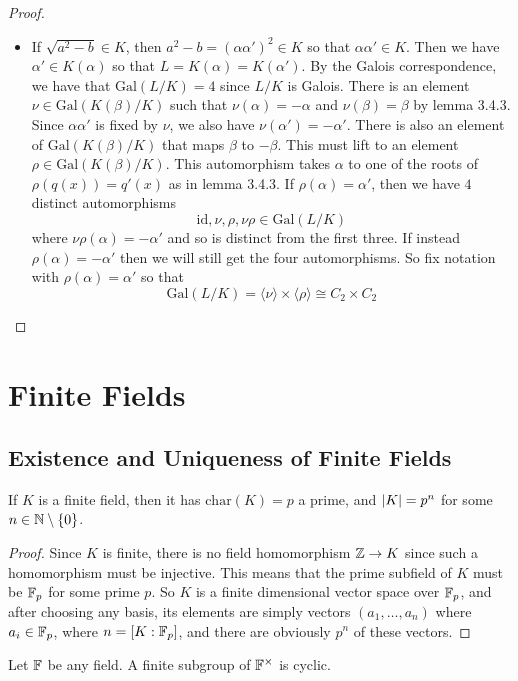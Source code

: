 \documentclass[a4paper]{article}
\begin{document}
\begin{thm}{}{}
\begin{proof}
\begin{itemize}
\item If $\sqrt{a^2-b}\in K$, then $a^2-b=(\alpha\alpha')^2\in K$ so that $\alpha\alpha'\in K$. Then we have $\alpha'\in K(\alpha)$ so that $L=K(\alpha)=K(\alpha')$. By the Galois correspondence, we have that $\text{Gal}(L/K)=4$ since $L/K$ is Galois. There is an element $\nu\in\text{Gal}(K(\beta)/K)$ such that $\nu(\alpha)=-\alpha$ and $\nu(\beta)=\beta$ by lemma 3.4.3. Since $\alpha\alpha'$ is fixed by $\nu$, we also have $\nu(\alpha')=-\alpha'$. There is also an element of $\text{Gal}(K(\beta)/K)$ that maps $\beta$ to $-\beta$. This must lift to an element $\rho\in\text{Gal}(K(\beta)/K)$. This automorphism takes $\alpha$ to one of the roots of $\rho(q(x))=q'(x)$ as in lemma 3.4.3.  If $\rho(\alpha)=\alpha'$, then we have $4$ distinct automorphisms $$\text{id},\nu,\rho,\nu\rho\in\text{Gal}(L/K)$$ where $\nu\rho(\alpha)=-\alpha'$ and so is distinct from the first three. If instead $\rho(\alpha)=-\alpha'$ then we will still get the four automorphisms. So fix notation with $\rho(\alpha)=\alpha'$ so that $$\text{Gal}(L/K)=\langle\nu\rangle\times\langle\rho\rangle\cong C_2\times C_2$$
\end{itemize}
\end{proof}
\end{thm}

\pagebreak
\section{Finite Fields}
\subsection{Existence and Uniqueness of Finite Fields}
\begin{prp}{}{} If $K$ is a finite field, then it has $\text{char}(K)=p$ a prime, and $\abs{K}=p^n$ for some $n\in\mathbb{N}\setminus\{0\}$. \tcbline
\begin{proof}
Since $K$ is finite, there is no field homomorphism $\mathbb{Z}\to K$ since such a homomorphism must be injective. This means that the prime subfield of $K$ must be $\mathbb{F}_p$ for some prime $p$. So $K$ is a finite dimensional vector space over $\mathbb{F}_p$, and after choosing any basis, its elements are simply vectors $(a_1,\dots,a_n)$ where $a_i\in\mathbb{F}_p$, where $n=[K:\mathbb{F}_p]$, and there are obviously $p^n$ of these vectors. 
\end{proof}
\end{prp}

\begin{lmm}{}{} Let $\mathbb{F}$ be any field. A finite subgroup of $\mathbb{F}^\times$ is cyclic. 
\end{lmm}
\end{document}
